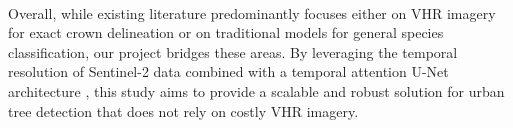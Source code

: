 \\
Overall, while existing literature predominantly focuses either on VHR imagery for exact crown delineation or on traditional models for general species classification, our project bridges these areas. By leveraging the temporal resolution of Sentinel-2 data \cite{freudenberg2025sentinel2, grabska2019forest} combined with a temporal attention U-Net architecture \cite{garnot2021panoptic}, this study aims to provide a scalable and robust solution for urban tree detection that does not rely on costly VHR imagery.